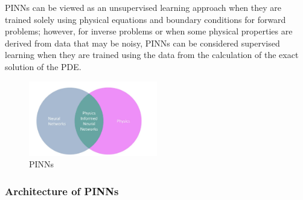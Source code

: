 \documentclass{article}
\begin{document}
PINNs can be viewed as an unsupervised learning approach when they are trained solely using physical equations and boundary conditions for forward problems; however, for inverse problems or when some physical properties are derived from data that may be noisy, PINNs can be considered supervised learning when they are trained using the data from the calculation of the exact solution of the PDE.
\begin{figure}[H]
    \centering
    \includegraphics[width=0.5\textwidth]{images/pinns}
    \caption{PINNs}
\end{figure}


\subsubsection{Architecture of PINNs}


\end{document}

